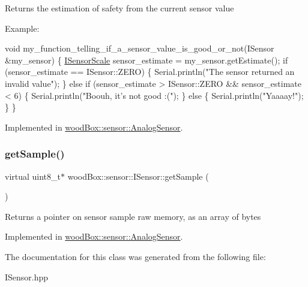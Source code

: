 Returns the estimation of safety from the current sensor value

Example\+:


\begin{DoxyCode}
\textcolor{keywordtype}{void} my\_function\_telling\_if\_a\_sensor\_value\_is\_good\_or\_not(ISensor &my\_sensor) \{
  \mbox{\hyperlink{classwood_box_1_1sensor_1_1_i_sensor_aa377bda61ed0d4a1d7e1a7bffe459452}{ISensorScale}} sensor\_estimate = my\_sensor.getEstimate();
  \textcolor{keywordflow}{if} (sensor\_estimate == ISensor::ZERO) \{
    Serial.println(\textcolor{stringliteral}{"The sensor returned an invalid value"});
  \}
  \textcolor{keywordflow}{else} \textcolor{keywordflow}{if} (sensor\_estimate > ISensor::ZERO && sensor\_estimate < 6) \{
    Serial.println(\textcolor{stringliteral}{"Boouh, it's not good :("});
  \}
  \textcolor{keywordflow}{else} \{
    Serial.println(\textcolor{stringliteral}{"Yaaaay!"});
  \}
\}
\end{DoxyCode}
 

Implemented in \mbox{\hyperlink{classwood_box_1_1sensor_1_1_analog_sensor_a74ddcfe84f3f5b9d7010442f365c4eee}{wood\+Box\+::sensor\+::\+Analog\+Sensor}}.

\mbox{\label{classwood_box_1_1sensor_1_1_i_sensor_a9de8041b991b76cc2f6fcc3b6a1bf363}} 
\subsubsection{\texorpdfstring{get\+Sample()}{getSample()}}
{\footnotesize\ttfamily virtual uint8\+\_\+t$\ast$ wood\+Box\+::sensor\+::\+I\+Sensor\+::get\+Sample (\begin{DoxyParamCaption}{ }\end{DoxyParamCaption})\hspace{0.3cm}{\ttfamily [pure virtual]}}

Returns a pointer on sensor sample raw memory, as an array of bytes 

Implemented in \mbox{\hyperlink{classwood_box_1_1sensor_1_1_analog_sensor_ae78c25d8c01ba9acd03f90f278966189}{wood\+Box\+::sensor\+::\+Analog\+Sensor}}.



The documentation for this class was generated from the following file\+:\begin{DoxyCompactItemize}
\item 
I\+Sensor.\+hpp\end{DoxyCompactItemize}

